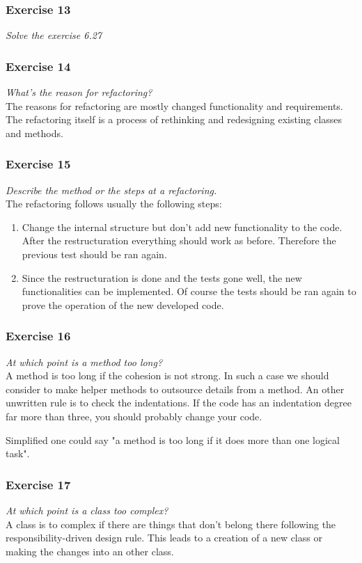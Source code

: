 \subsubsection*{Exercise 13}
\textit{Solve the exercise 6.27} \\

\subsubsection*{Exercise 14}
\textit{What's the reason for refactoring?} \\
The reasons for refactoring are mostly changed functionality and
requirements. The refactoring itself is a process of rethinking
and redesigning existing classes and methods.

\subsubsection*{Exercise 15}
\textit{Describe the method or the steps at a refactoring.} \\
The refactoring follows usually the following steps:
\begin{enumerate}
	\item 	Change the internal structure but don't add new 
		functionality to the code.
		After the restructuration everything should work as before.
		Therefore the previous test should be ran again.
	\item	Since the restructuration is done and the tests gone well,
		the new functionalities can be implemented. Of course the
		tests should be ran again to prove the operation of the new
		developed code.
\end{enumerate}

\subsubsection*{Exercise 16}
\textit{At which point is a method too long?} \\
A method is too long if the cohesion is not strong. In such a case we 
should consider to make helper methods to outsource details from a 
method. An other unwritten rule is to check the indentations. If the code
has an indentation degree far more than three, you should probably change
your code. 

Simplified one could say "a method is too long if it does more than one 
logical task".

\subsubsection*{Exercise 17}
\textit{At which point is a class too complex?} \\
A class is to complex if there are things that don't belong there following
the responsibility-driven design rule. This leads to a creation of a new 
class or making the changes into an other class.

